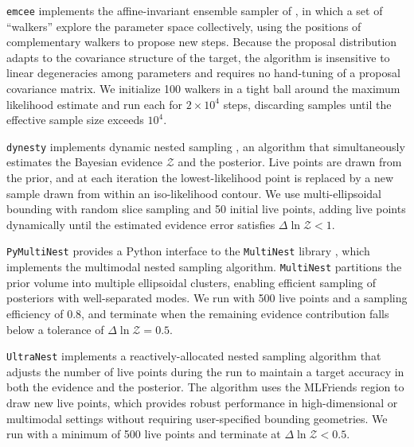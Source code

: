 \texttt{emcee} \citep{ForemanMackey13} implements the
affine-invariant ensemble sampler of \citet{GoodmanWeare10}, in which
a set of ``walkers'' explore the parameter space collectively, using
the positions of complementary walkers to propose new steps. Because
the proposal distribution adapts to the covariance structure of the
target, the algorithm is insensitive to linear degeneracies among
parameters and requires no hand-tuning of a proposal covariance
matrix. We initialize 100 walkers in a tight ball around the maximum
likelihood estimate and run each for $2\times10^{4}$ steps, discarding
samples until the effective sample size exceeds $10^{4}$.

\texttt{dynesty} \citep{Speagle20} implements dynamic nested sampling
\citep{Skilling04,Higson19}, an algorithm that simultaneously
estimates the Bayesian evidence $\mathcal{Z}$ and the posterior. Live
points are drawn from the prior, and at each iteration the
lowest-likelihood point is replaced by a new sample drawn from within
an iso-likelihood contour. We use multi-ellipsoidal bounding with
random slice sampling \citep{Handley15a,Handley15b} and 50 initial
live points, adding live points dynamically until the estimated
evidence error satisfies $\Delta\ln\mathcal{Z} < 1$.

\texttt{PyMultiNest} \citep{Buchner14} provides a Python interface to
the \texttt{MultiNest} library \citep{Feroz09,Feroz19}, which
implements the multimodal nested sampling algorithm. \texttt{MultiNest}
partitions the prior volume into multiple ellipsoidal clusters,
enabling efficient sampling of posteriors with well-separated modes.
We run with 500 live points and a sampling efficiency of 0.8, and
terminate when the remaining evidence contribution falls below a
tolerance of $\Delta\ln\mathcal{Z} = 0.5$.

\texttt{UltraNest} \citep{Buchner21} implements a
reactively-allocated nested sampling algorithm that adjusts the number
of live points during the run to maintain a target accuracy in both
the evidence and the posterior. The algorithm uses the MLFriends
region \citep{Buchner19} to draw new live points, which provides
robust performance in high-dimensional or multimodal settings without
requiring user-specified bounding geometries. We run with a minimum of
500 live points and terminate at $\Delta\ln\mathcal{Z} < 0.5$.
